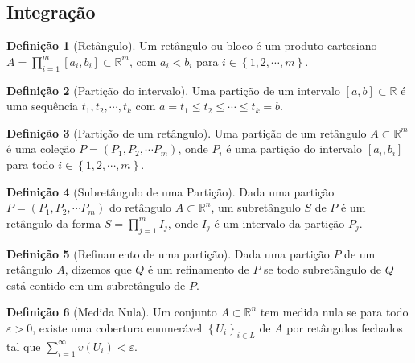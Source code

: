 \documentclass{article}
\theoremstyle{theorem}
\theoremstyle{lemma}
\theoremstyle{definition}
\newtheorem{definicao}{Definição}[section]
\theoremstyle{remark}
\begin{document}
\subsection{Integração}
\begin{definicao}[Retângulo]
	Um retângulo ou bloco é um produto cartesiano $A = \displaystyle\prod_{i = 1}^m [a_i,b_i] \subset \mathbb{R}^m$, com $a_i < b_i$ para $i\in \left\{1,2, \cdots ,m \right\}$.
\end{definicao}
\begin{definicao}[Partição do intervalo]
	Uma partição de um intervalo $[a,b] \subset \mathbb{R}$ é uma sequência  $t_1,t_2,\cdots, t_k$ com $a = t_1 \leq t_2 \leq \cdots \leq t_k = b$.
\end{definicao}
\begin{definicao}[Partição de um retângulo]
	Uma partição de um retângulo $A \subset \mathbb{R}^m$ é uma coleção $P = (P_1,P_2,\cdots P_m)$, onde $P_i$ é uma partição do  intervalo $[a_i,b_i]$ para todo $i\in \left\{1,2, \cdots ,m \right\}$.
\end{definicao}

\begin{definicao}[Subretângulo de uma Partição]
	Dada uma partição $P = (P_1, P_2, \cdots P_m)$ do retângulo $A\subset \mathbb{R}^n$, um subretângulo $S$ de $P$ é um retângulo da forma $S = \displaystyle\prod_{j = 1}^m I_j$, onde $I_j$ é um intervalo da partição $P_j$.
\end{definicao}
\begin{definicao}[Refinamento de uma partição]
	Dada uma partição $P$ de um retângulo $A$, dizemos que $Q$ é um refinamento de $P$ se todo subretângulo de $Q$ está contido em um subretângulo de $P$.
\end{definicao}
\begin{definicao}[Medida Nula]
	Um conjunto $A\subset \mathbb{R}^n$ tem medida nula se para todo $\varepsilon>0$,  existe uma cobertura enumerável    $\left\{ U_i \right\}_{i\in L}$ de $A$ por retângulos fechados tal que $\displaystyle\sum_{i = 1}^{\infty} v\left(U_i\right) < \varepsilon$.
\end{definicao}
\end{document}
